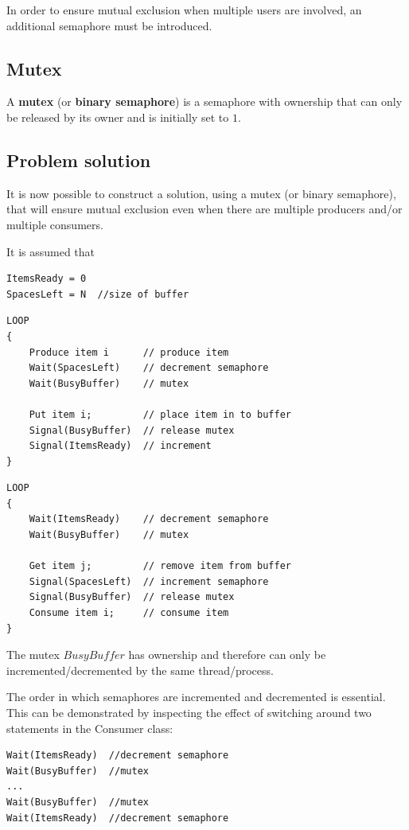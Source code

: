\documentclass[a4paper]{systems-software}
\begin{document}
In order to ensure mutual exclusion when multiple users are involved, an additional semaphore must be introduced.


\subsection*{Mutex}

A \textbf{mutex} (or \textbf{binary semaphore}) is a semaphore with ownership that can only be released by its owner and is initially set to $1$.


\subsection*{Problem solution}

It is now possible to construct a solution, using a mutex (or binary semaphore), that will ensure mutual exclusion even when there are multiple producers and/or multiple consumers.

It is assumed that
\begin{lstlisting}
ItemsReady = 0
SpacesLeft = N  //size of buffer
\end{lstlisting}

\begin{lstlisting}[title={Producer class}]
LOOP
{
	Produce item i      // produce item
	Wait(SpacesLeft)    // decrement semaphore
	Wait(BusyBuffer)    // mutex

	Put item i;         // place item in to buffer
	Signal(BusyBuffer)  // release mutex
	Signal(ItemsReady)  // increment
}
\end{lstlisting}

\begin{lstlisting}[title={Consumer class}]
LOOP
{
	Wait(ItemsReady)    // decrement semaphore
    Wait(BusyBuffer)    // mutex

    Get item j;         // remove item from buffer
    Signal(SpacesLeft)  // increment semaphore
    Signal(BusyBuffer)  // release mutex
    Consume item i;     // consume item
}
\end{lstlisting}

The mutex $BusyBuffer$ has ownership and therefore can only be incremented/decremented by the same thread/process.

The order in which semaphores are incremented and decremented is essential. This can be demonstrated by inspecting the effect of switching around two statements in the Consumer class:
\begin{lstlisting}
Wait(ItemsReady)  //decrement semaphore
Wait(BusyBuffer)  //mutex
...
Wait(BusyBuffer)  //mutex
Wait(ItemsReady)  //decrement semaphore
\end{lstlisting}
\end{document}
